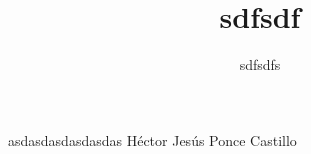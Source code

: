 \documentclass[10pt,letterpaper]{article}
\author{sdfsdfs}
\title{sdfsdf}
\begin{document}
asdasdasdasdasdas  Héctor Jesús Ponce Castillo\\
\end{document}
